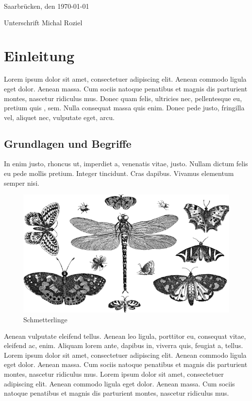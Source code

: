 \documentclass[paper=a4,fontsize=12pt,ngerman]{scrartcl}
\begin{document}
Saarbrücken, den \today

\smallskip
Unterschrift  Michal Roziel




\clearpage
\tableofcontents 

\clearpage
{}

\section{Einleitung}
Lorem ipsum dolor sit amet, consectetuer adipiscing elit. Aenean commodo 
ligula eget dolor. Aenean massa. Cum sociis natoque penatibus et magnis dis 
parturient montes, nascetur ridiculus mus. Donec quam felis, ultricies nec, 
pellentesque eu, pretium quis \cite{ahu61}, sem. Nulla consequat massa quis 
enim. Donec pede justo, fringilla vel, aliquet nec, vulputate eget, arcu.

\subsection{Grundlagen und Begriffe}
In enim justo, rhoncus ut, imperdiet a, venenatis vitae, justo. Nullam dictum 
felis eu pede mollis pretium. Integer tincidunt. Cras dapibus. Vivamus 
elementum semper nisi.
\begin{figure}[h]
\begin{center}
  \includegraphics[scale=0.35]{graphics/insects-5304085_640.png}
  \caption{Schmetterlinge}
  \label{schmetter}
\end{center}
\end{figure}
Aenean vulputate eleifend tellus. Aenean leo ligula, porttitor eu, consequat 
vitae, eleifend ac, enim. Aliquam lorem ante, dapibus in, viverra quis, 
feugiat a, tellus. Lorem ipsum dolor sit amet, consectetuer adipiscing elit. 
Aenean commodo ligula eget dolor. Aenean massa. Cum sociis natoque penatibus 
et magnis dis parturient montes, nascetur ridiculus mus. Lorem ipsum dolor 
sit amet, consectetuer adipiscing elit. Aenean commodo ligula eget dolor. 
Aenean massa. Cum sociis natoque penatibus et magnis dis parturient montes, 
nascetur ridiculus mus.
\end{document}
